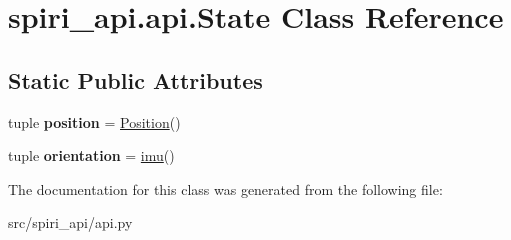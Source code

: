 \hypertarget{classspiri__api_1_1api_1_1_state}{\section{spiri\-\_\-api.\-api.\-State \-Class \-Reference}
\label{classspiri__api_1_1api_1_1_state}
}
\subsection*{\-Static \-Public \-Attributes}
\begin{DoxyCompactItemize}
\item 
\hypertarget{classspiri__api_1_1api_1_1_state_a0715ea58dafd0ce46f3d39b9a3c824b4}{tuple {\bfseries position} = \hyperlink{classspiri__api_1_1api_1_1_position}{\-Position}()}\label{classspiri__api_1_1api_1_1_state_a0715ea58dafd0ce46f3d39b9a3c824b4}

\item 
\hypertarget{classspiri__api_1_1api_1_1_state_aad8621f10a5315904263d8fee624b5e8}{tuple {\bfseries orientation} = \hyperlink{classspiri__api_1_1api_1_1imu}{imu}()}\label{classspiri__api_1_1api_1_1_state_aad8621f10a5315904263d8fee624b5e8}

\end{DoxyCompactItemize}


\-The documentation for this class was generated from the following file\-:\begin{DoxyCompactItemize}
\item 
src/spiri\-\_\-api/api.\-py\end{DoxyCompactItemize}
